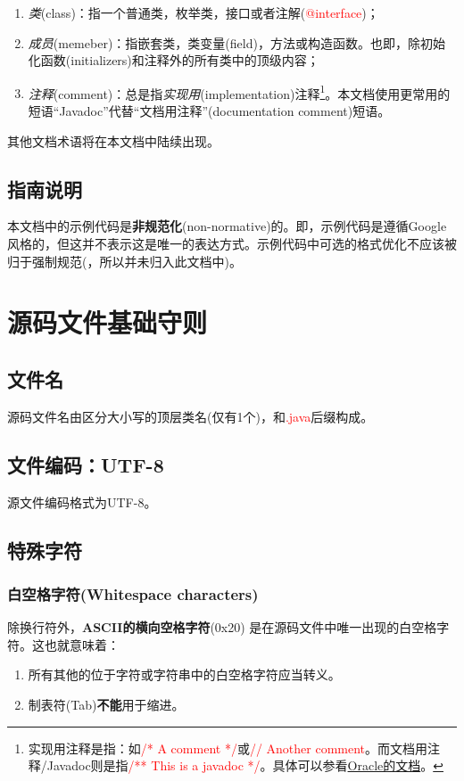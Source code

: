 \documentclass[cn,11pt,chinese]{elegantbook}
\begin{document}
\begin{enumerate}
  \item \emph{类}(class)：指一个普通类，枚举类，接口或者注解(\textcolor{red}{@interface})；
  \item \emph{成员}(memeber)：指嵌套类，类变量(field)，方法或构造函数。也即，除初始化函数(initializers)和注释外的所有类中的顶级内容；
  \item \emph{注释}(comment)：总是指\emph{实现用}(implementation)注释\footnote{实现用注释是指：如\textcolor{red}{/* A comment */}或\textcolor{red}{// Another comment}。而文档用注释/Javadoc则是指\textcolor{red}{/** This is a javadoc */}。具体可以参看\href{https://www.oracle.com/java/technologies/javase/codeconventions-comments.html}{Oracle的文档}。}。本文档使用更常用的短语``Javadoc''代替``文档用注释''(documentation comment)短语。
\end{enumerate}

其他文档术语将在本文档中陆续出现。

\section{指南说明}

本文档中的示例代码是\textbf{非规范化}(non-normative)的。即，示例代码是遵循Google风格的，但这并不表示这是唯一的表达方式。示例代码中可选的格式优化不应该被归于强制规范(，所以并未归入此文档中)。

\chapter{源码文件基础守则}

\section{文件名}
源码文件名由区分大小写的顶层类名(仅有1个)，和\textcolor{red}{.java}后缀构成。

\section{文件编码：UTF-8}
源文件编码格式为UTF-8。

\section{特殊字符}
\subsection{白空格字符(Whitespace characters)}
除换行符外，\textbf{ASCII的横向空格字符}(0x20) 是在源码文件中唯一出现的白空格字符。这也就意味着：
\begin{enumerate}
	\item 所有其他的位于字符或字符串中的白空格字符应当转义。
	\item 制表符(Tab)\textbf{不能}用于缩进。
\end{enumerate}
\end{document}
